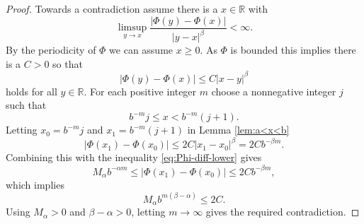\documentclass[12pt]{amsart}
\numberwithin{equation}{section}
\newcommand{\R}{{\mathbb R}}		%
\theoremstyle{definition}
\theoremstyle{remark}
\begin{document}
\begin{proof}
Towards a contradiction assume there is a $x\in \R$ with
$$
\limsup_{y\to x} \frac{|\Phi(y) - \Phi(x)|}{|y-x|^\beta} <\infty.
$$
By the periodicity of $\Phi$ we can assume $x \geq 0$.
As $\Phi$ is bounded
this implies there is a $C>0$ so that
$$
|\Phi(y)-\Phi(x)|\le C |x-y|^\beta
$$
holds for all $y\in \R$.
For each positive integer $m$ choose a nonnegative integer  $j$ such
that 
$$
b^{-m} j \le x < b^{-m}(j+1).
$$
Letting $x_0=b^{-m} j $ and $x_1 = b^{-m}(j+1)$ in Lemma \ref{lem:a<x<b} 
$$
|\Phi(x_1) - \Phi(x_0)| \le 2 C |x_1- x_0|^\beta = 2C b^{-\beta m}.
$$
Combining this with the inequality \eqref{eq:Phi-diff-lower} gives 
$$
M_\alpha b^{-\alpha m}\le  |\Phi(x_1) - \Phi(x_0)| \le 2C b^{-\beta m}, 
$$
which implies
$$
M_\alpha b^{m(\beta - \alpha)} \le 2C.
$$
Using $M_\alpha >0$ and  $\beta-\alpha>0$, letting $m\to \infty$ gives
the required  contradiction.
\end{proof}
\end{document}
